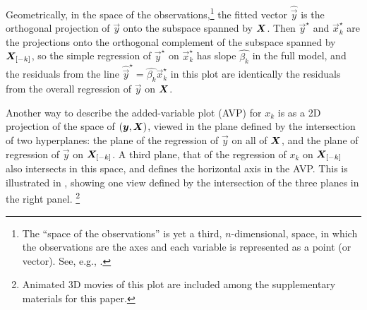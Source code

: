 Geometrically, in the space of the observations,\footnote{The ``space of the observations'' is yet a third, $n$-dimensional, space, in which the observations are the axes and each variable is represented as a point (or vector). See, e.g., \citet[Ch.~10]{Fox:2008}.} the fitted vector $\widehat{\vec{y}}$ is the orthogonal projection of $\vec{y}$
onto the subspace spanned by $\bm{X}$. Then $\vec{y}^\star$ and $\vec{x}^\star_k$ are the projections onto
the orthogonal complement of the subspace spanned by $\bm{X}_{[-k]}$, so
the simple regression of $\vec{y}^\star$ on $\vec{x}^\star_k$ has slope $\hat{\beta_k}$ in the full model,
and the residuals from the line 
$\widehat{\vec{y}}^\star = \hat{\beta_k} \vec{x}^\star_k$ in this plot are identically
the residuals from the overall regression of $\vec{y}$ on $\bm{X}$.

Another way to describe the added-variable plot (AVP) for $x_k$ is as a 2D projection of the space of
$(\bm{y}, \bm{X})$, viewed in the plane defined by the intersection of two hyperplanes:
the plane of the regression of $\vec{y}$ on all of $\bm{X}$, and the plane of regression of
$\vec{y}$ on $\bm{X}_{[-k]}$. A third plane, that of the regression of $x_k$ on $\bm{X}_{[-k]}$
also intersects in this space, and defines the horizontal axis in the AVP.
This is illustrated in , showing one view defined by the intersection of
the three planes in the right panel.%
\footnote{Animated 3D movies of this plot are included among the supplementary materials for this paper.}

